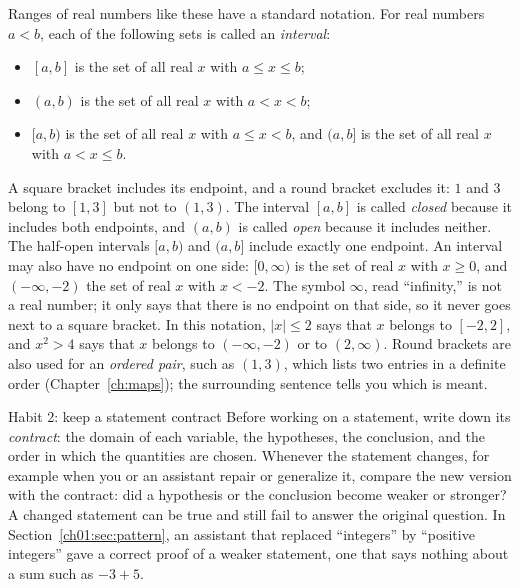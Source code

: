 Ranges of real numbers like these have a standard notation. For real numbers $a<b$, each of the following sets is called an \emph{interval}:
\begin{itemize}
\item $[a,b]$ is the set of all real $x$ with $a\le x\le b$;
\item $(a,b)$ is the set of all real $x$ with $a<x<b$;
\item $[a,b)$ is the set of all real $x$ with $a\le x<b$, and $(a,b]$ is the set of all real $x$ with $a<x\le b$.
\end{itemize}
A square bracket includes its endpoint, and a round bracket excludes it: $1$ and $3$ belong to $[1,3]$ but not to $(1,3)$. The interval $[a,b]$ is called \emph{closed} because it includes both endpoints, and $(a,b)$ is called \emph{open} because it includes neither. The half-open intervals $[a,b)$ and $(a,b]$ include exactly one endpoint. An interval may also have no endpoint on one side: $[0,\infty)$ is the set of real $x$ with $x\ge0$, and $(-\infty,-2)$ the set of real $x$ with $x<-2$. The symbol $\infty$, read ``infinity,'' is not a real number; it only says that there is no endpoint on that side, so it never goes next to a square bracket. In this notation, $|x|\le2$ says that $x$ belongs to $[-2,2]$, and $x^2>4$ says that $x$ belongs to $(-\infty,-2)$ or to $(2,\infty)$. Round brackets are also used for an \emph{ordered pair}, such as $(1,3)$, which lists two entries in a definite order (Chapter~\ref{ch:maps}); the surrounding sentence tells you which is meant.

\begin{principle}{Habit 2: keep a statement contract}
Before working on a statement, write down its \emph{contract}: the domain of each variable, the hypotheses, the conclusion, and the order in which the quantities are chosen. Whenever the statement changes, for example when you or an assistant repair or generalize it, compare the new version with the contract: did a hypothesis or the conclusion become weaker or stronger? A changed statement can be true and still fail to answer the original question. In Section~\ref{ch01:sec:pattern}, an assistant that replaced ``integers'' by ``positive integers'' gave a correct proof of a weaker statement, one that says nothing about a sum such as $-3+5$.
\end{principle}
